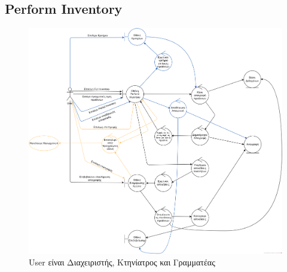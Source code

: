 \documentclass[12pt,a4paper,twoside]{book}
\begin{document}
\subsection{Perform Inventory}
\begin{figure}[H]
    \centering
    \includegraphics[width=\textwidth]{Resources/Robustness Diagram/Perform_Inventory_RD.png}
    \caption{User είναι Διαχειριστής, Κτηνίατρος και Γραμματέας}\label{fig:robustness-perform-inventory}
\end{figure}
\end{document}
